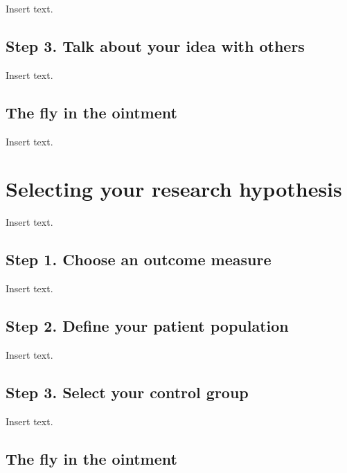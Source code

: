 \documentclass[
  letterpaper,
  DIV=11,
  numbers=noendperiod]{scrreprt}
\begin{document}
Insert text.

\hypertarget{step-3.-talk-about-your-idea-with-others}{%
\section{Step 3. Talk about your idea with
others}\label{step-3.-talk-about-your-idea-with-others}}

Insert text.

\hypertarget{the-fly-in-the-ointment}{%
\section{The fly in the ointment}\label{the-fly-in-the-ointment}}

Insert text.


\hypertarget{selecting-your-research-hypothesis}{%
\chapter{Selecting your research
hypothesis}\label{selecting-your-research-hypothesis}}

Insert text.

\hypertarget{step-1.-choose-an-outcome-measure}{%
\section{Step 1. Choose an outcome
measure}\label{step-1.-choose-an-outcome-measure}}

Insert text.

\hypertarget{step-2.-define-your-patient-population}{%
\section{Step 2. Define your patient
population}\label{step-2.-define-your-patient-population}}

Insert text.

\hypertarget{step-3.-select-your-control-group}{%
\section{Step 3. Select your control
group}\label{step-3.-select-your-control-group}}

Insert text.

\hypertarget{the-fly-in-the-ointment-1}{%
\section{The fly in the ointment}\label{the-fly-in-the-ointment-1}}
\end{document}
